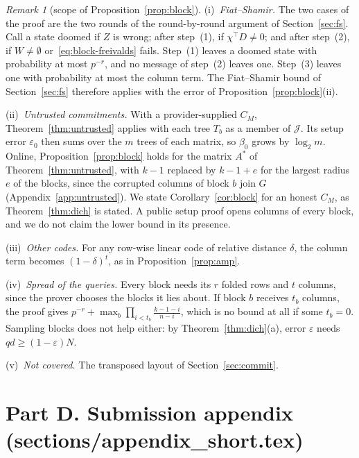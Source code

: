 \documentclass[conference,compsoc]{IEEEtran}
\newcommand{\T}{\top}
\theoremstyle{plain}
\theoremstyle{definition}
\theoremstyle{remark}
\newtheorem{remark}{Remark}
\begin{document}
\begin{remark}[scope of Proposition~\ref{prop:block}]
\label{rem:block-scope}
(i)~\emph{Fiat--Shamir.} The two cases of the proof are the two rounds of the round-by-round argument
of Section~\ref{sec:fs}. Call a state doomed if $Z$ is wrong; after step~(1), if $\chi^\T D\neq0$;
and after step~(2), if $W\neq\emptyset$ or~\eqref{eq:block-freivalds} fails. Step~(1) leaves a doomed
state with probability at most $p^{-r}$, and no message of step~(2) leaves one. Step~(3) leaves one
with probability at most the column term. The Fiat--Shamir bound of Section~\ref{sec:fs} therefore
applies with the error of Proposition~\ref{prop:block}(ii).

(ii)~\emph{Untrusted commitments.} With a provider-supplied $C_M$, Theorem~\ref{thm:untrusted}
applies with each tree $T_b$ as a member of $\mathcal J$. Its setup error $\varepsilon_0$ then sums
over the $m$ trees of each matrix, so $\beta_0$ grows by $\log_2m$. Online,
Proposition~\ref{prop:block} holds for the matrix $A^*$ of Theorem~\ref{thm:untrusted}, with $k-1$
replaced by $k-1+e$ for the largest radius $e$ of the blocks, since the corrupted columns of block $b$
join $G$ (Appendix~\ref{app:untrusted}). We state Corollary~\ref{cor:block} for an honest $C_M$, as
Theorem~\ref{thm:dich} is stated. A public setup proof opens columns of every block, and we do not
claim the lower bound in its presence.

(iii)~\emph{Other codes.} For any row-wise linear code of relative distance $\delta$, the column term
becomes $(1-\delta)^t$, as in Proposition~\ref{prop:amp}.

(iv)~\emph{Spread of the queries.} Every block needs its $r$ folded rows and $t$ columns, since the
prover chooses the blocks it lies about. If block $b$ receives $t_b$ columns, the proof gives
$p^{-r}+\max_b\prod_{i<t_b}\frac{k-1-i}{n-i}$, which is no bound at all if some $t_b=0$. Sampling
blocks does not help either: by Theorem~\ref{thm:dich}(a), error $\varepsilon$ needs
$qd\ge(1-\varepsilon)N$.

(v)~\emph{Not covered.} The transposed layout of Section~\ref{sec:commit}.
\end{remark}

\section*{Part D. Submission appendix (sections/appendix\_short.tex)}
\end{document}
